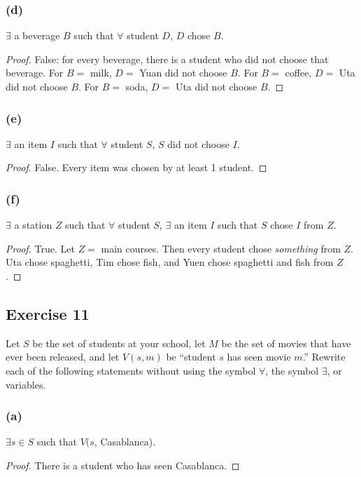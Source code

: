 \documentclass[14pt]{extarticle}
\newcommand{\fa}{\forall}
\newcommand{\te}{\exists}
\begin{document}
\subsubsection{(d)}
$\te$ a beverage $B$ such that $\fa$ student $D$, $D$ chose $B$.

\begin{proof}
False: for every beverage, there is a student who did not choose that beverage. For $B = $ milk, $D = $ Yuan did not choose $B$. For $B = $ coffee, $D = $ Uta did not choose $B$. For $B = $ soda, $D = $ Uta did not choose $B$. 
\end{proof}

\subsubsection{(e)}
$\te$ an item $I$ such that $\fa$ student $S$, $S$ did not choose $I$.

\begin{proof}
False. Every item was chosen by at least 1 student.
\end{proof}

\subsubsection{(f)}
$\te$ a station $Z$ such that $\fa$ student $S$, $\te$ an item $I$ such that $S$ chose $I$ from $Z$.

\begin{proof}
True. Let $Z = $ main courses. Then every student chose {\it something} from $Z$. Uta chose spaghetti, Tim chose fish, and Yuen chose spaghetti and fish from $Z$.
\end{proof}

\subsection{Exercise 11}
Let $S$ be the set of students at your school, let $M$ be the set of movies that have ever been released, and let $V(s, m)$ be “student $s$ has seen movie $m$.” Rewrite each of the following statements without using the symbol $\fa$, the symbol $\te$, or variables.

\subsubsection{(a)}
$\te s \in S$ such that $V(s$, Casablanca).

\begin{proof}
There is a student who has seen Casablanca.
\end{proof}
\end{document}

